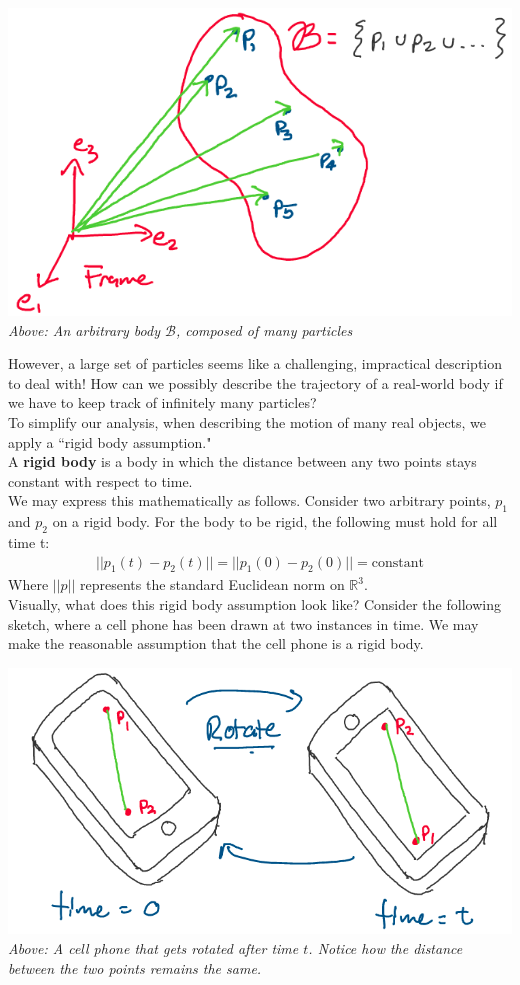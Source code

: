 \documentclass[oneside]{book}
\begin{document}
\begin{center}
    \includegraphics[scale=0.4]{images/arbbody.png}\\
    \textit{Above: An arbitrary body $\mathcal{B}$, composed of many particles}
\end{center}
However, a large set of particles seems like a challenging, impractical description to deal with! How can we possibly describe the trajectory of a real-world body if we have to keep track of infinitely many particles?\\
To simplify our analysis, when describing the motion of many real objects, we apply a ``rigid body assumption."\\
A \textbf{rigid body} is a body in which the distance between any two points stays constant with respect to time. \\
We may express this mathematically as follows. Consider two arbitrary points, $p_1$ and $p_2$ on a rigid body. For the body to be rigid, the following must hold for all time t:
\begin{align}
    ||p_1(t) - p_2(t)|| = ||p_1(0) - p_2(0)|| = \mathrm{constant}
\end{align}
Where $||p||$ represents the standard Euclidean norm on $\mathbb{R}^3$.\\
Visually, what does this rigid body assumption look like? Consider the following sketch, where a cell phone has been drawn at two instances in time. We may make the reasonable assumption that the cell phone is a rigid body.
\begin{center}
    \includegraphics[scale=0.35]{images/cellphone.png}\\
    \textit{Above: A cell phone that gets rotated after time $t$. Notice how the distance between the two points remains the same.}
\end{center}
\end{document}
